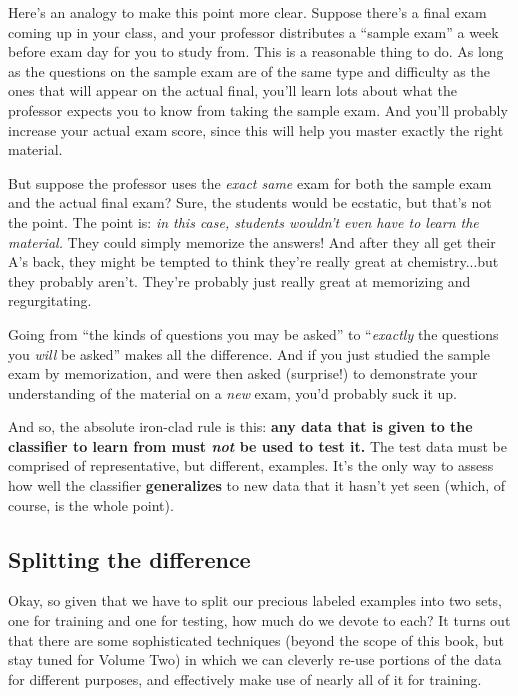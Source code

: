 Here's an analogy to make this point more clear. Suppose there's a final exam
coming up in your class, and your professor distributes a ``sample exam'' a
week before exam day for you to study from. This is a reasonable thing to do.
As long as the questions on the sample exam are of the same type and difficulty
as the ones that will appear on the actual final, you'll learn lots about what
the professor expects you to know from taking the sample exam. And you'll
probably increase your actual exam score, since this will help you master
exactly the right material.

But suppose the professor uses the \textit{exact same} exam for both the sample
exam and the actual final exam? Sure, the students would be ecstatic, but
that's not the point. The point is: \textit{in this case, students wouldn't
even have to learn the material.} They could simply memorize the answers! And
after they all get their A's back, they might be tempted to think they're
really great at chemistry...but they probably aren't. They're probably just
really great at memorizing and regurgitating.

Going from ``the kinds of questions you may be asked'' to ``\textit{exactly}
the questions you \textit{will} be asked'' makes all the difference. And if you
just studied the sample exam by memorization, and were then asked (surprise!)
to demonstrate your understanding of the material on a \textit{new} exam, you'd
probably suck it up.


And so, the absolute iron-clad rule is this: \textbf{any data that is given to
the classifier to learn from must \textit{not} be used to test it.} The test
data must be comprised of representative, but different, examples. It's the
only way to assess how well the classifier \textbf{generalizes} to new data
that it hasn't yet seen (which, of course, is the whole point).


\subsection{Splitting the difference}

Okay, so given that we have to split our precious labeled examples into two
sets, one for training and one for testing, how much do we devote to each? It
turns out that there are some sophisticated techniques (beyond the scope of
this book, but stay tuned for Volume Two) in which we can cleverly re-use
portions of the data for different purposes, and effectively make use of nearly
all of it for training.

